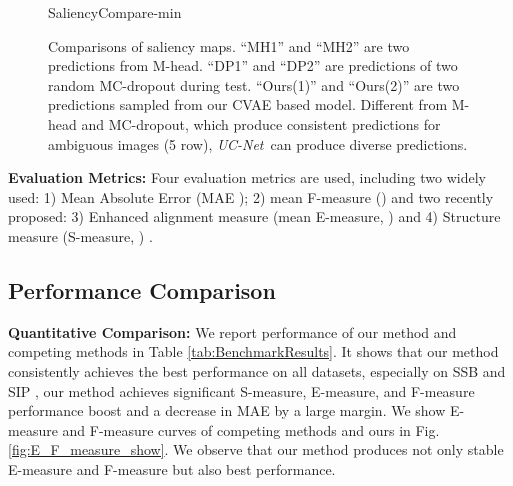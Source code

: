 \documentclass[10pt,twocolumn,letterpaper]{article}
\def\ourmodel{\textit{UC-Net}}
\begin{document}
\begin{figure*}[t!]
	\centering
    \small
	\begin{overpic}[width=\textwidth]{SaliencyCompare-min}
    \end{overpic}
\caption{\small Comparisons of saliency maps. \enquote{MH1} and \enquote{MH2} are two predictions from M-head. \enquote{DP1} and \enquote{DP2} are predictions of two random MC-dropout during test. \enquote{Ours(1)} and \enquote{Ours(2)} are two predictions sampled from our CVAE based model.
Different from M-head and MC-dropout, which produce consistent predictions for ambiguous images (5 row), \ourmodel~can produce diverse predictions.
}
\vspace{-4mm}
\label{fig:saliency_compare}
\end{figure*}

\noindent\textbf{Evaluation Metrics:}
Four evaluation metrics are used, including two widely used: 1) Mean Absolute Error (MAE ); 2) mean F-measure () and two recently proposed: 3) Enhanced alignment measure (mean E-measure, ) \cite{Fan2018Enhanced} and 4) Structure measure (S-measure, ) \cite{fan2017structure}.
















\subsection{Performance Comparison}


\noindent\textbf{Quantitative Comparison:}
We report performance of our method and competing methods in Table \ref{tab:BenchmarkResults}. It shows that our method consistently achieves the best performance on all datasets, especially on SSB \cite{niu2012leveraging} and SIP \cite{sip_dataset}, our method achieves significant S-measure, E-measure, and F-measure performance boost and a decrease in MAE by a large margin. We show E-measure and F-measure curves of competing methods and ours in Fig. \ref{fig:E_F_measure_show}. 
We observe that our method produces not only stable E-measure and F-measure but also best performance.
\end{document}
